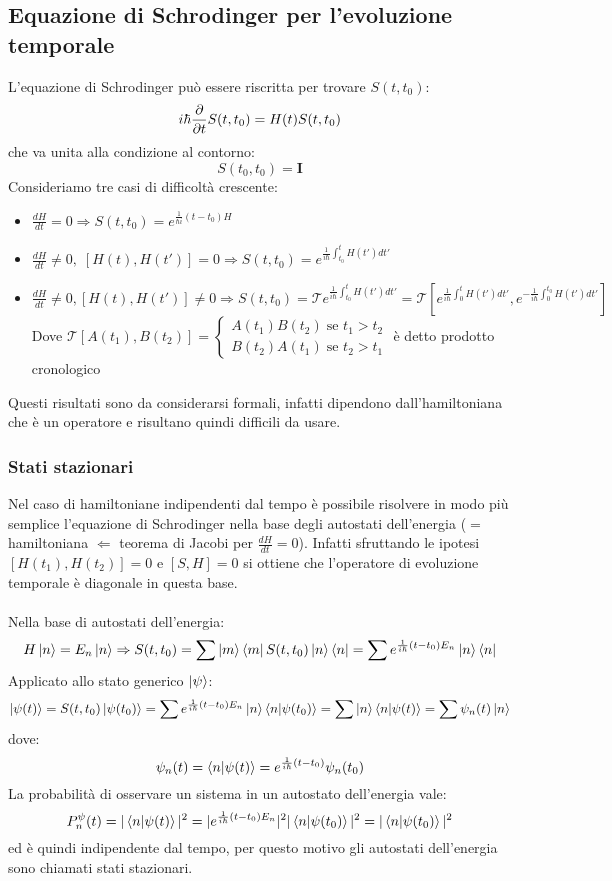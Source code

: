 \documentclass{article}
\begin{document}
\subsection{Equazione di Schrodinger per l'evoluzione temporale}
L'equazione di Schrodinger può essere riscritta per trovare $S(t,t_0)$:
$$ i\hbar\pdv{}{t} S(t,t_0)=H(t)S(t,t_0) $$
che va unita alla condizione al contorno:
$$ S(t_0,t_0)=\mathbf{I} $$
Consideriamo tre casi di difficoltà crescente:
\begin{itemize}
    \item $\frac{dH}{dt}=0\Rightarrow S(t,t_0)=e^{\frac{1}{\hbar i}(t-t_0)H}$
    \item $\frac{dH}{dt}\neq0,\;[H(t),H(t')]=0\Rightarrow S(t,t_0)=e^{\frac{1}{i\hbar}\int_{t_0}^tH(t')dt'}$
    \item $\frac{dH}{dt}\neq0, [H(t),H(t')]\neq0\Rightarrow S(t,t_0)=\mathcal{T}e^{\frac{1}{i\hbar}\int_{t_0}^tH(t')dt'}=\mathcal{T}[e^{\frac{1}{i\hbar}\int_0^tH(t')dt'}, e^{-\frac{1}{i\hbar}\int_0^{t_0}H(t')dt'}]$\\
    Dove $\mathcal{T}[A(t_1),B(t_2)]=\begin{cases}A(t_1)B(t_2) \;\text{se $t_1>t_2$}\\ B(t_2)A(t_1) \;\text{se $t_2>t_1$} \end{cases}$ è detto prodotto cronologico
\end{itemize}
Questi risultati sono da considerarsi formali, infatti dipendono dall'hamiltoniana che è un operatore e risultano quindi difficili da usare.

\subsubsection{Stati stazionari}
Nel caso di hamiltoniane indipendenti dal tempo è possibile risolvere in modo più semplice l'equazione di Schrodinger nella base degli autostati dell'energia ($=$ hamiltoniana $\Leftarrow$ teorema di Jacobi per $\frac{dH}{dt}=0$). Infatti sfruttando le ipotesi $[H(t_1),H(t_2)]=0$ e $[S,H]=0$ si ottiene che l'operatore di evoluzione temporale è diagonale in questa base.\\\\
Nella base di autostati dell'energia:
$$ H\ket{n}=E_n\ket{n}\Rightarrow S(t,t_0)=\sum\ket{m}\bra{m}S(t,t_0)\ket{n}\bra{n}=\sum e^{\frac{1}{i\hbar}(t-t_0)E_n}\ket{n}\bra{n} $$
Applicato allo stato generico $\ket{\psi}$:
$$ \ket{\psi(t)}=S(t,t_0)\ket{\psi(t_0)}=\sum e^{\frac{1}{i\hbar}(t-t_0)E_n}\ket{n}\bra{n}\ket{\psi(t_0)}=\sum\ket{n}\bra{n}\ket{\psi(t)}=\sum\psi_n(t)\ket{n} $$
dove:
$$ \psi_n(t)=\bra{n}\ket{\psi(t)}=e^{\frac{1}{i\hbar}(t-t_0)}\psi_n(t_0) $$
La probabilità di osservare un sistema in un autostato dell'energia vale:
$$ P_n^\psi(t)=|\bra{n}\ket{\psi(t)}|^2=|e^{\frac{1}{i\hbar}(t-t_0)E_n}|^2|\bra{n}\ket{\psi(t_0)}|^2=|\bra{n}\ket{\psi(t_0)}|^2 $$
ed è quindi indipendente dal tempo, per questo motivo gli autostati dell'energia sono chiamati stati stazionari.
\end{document}
